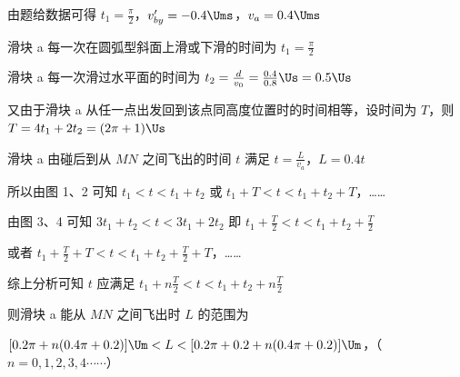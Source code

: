 \documentclass[\gkver]{gaokaozhenti}
\begin{document}
\begin{enumerate}
{

由题给数据可得 $t_{1}=\frac{\pi}{2}$，$v_{by}'=-0.4\Ums$，$v_{a}=0.4\Ums$

滑块 a 每一次在圆弧型斜面上滑或下滑的时间为 $t_{1}=\frac{\pi}{2}$

滑块 a 每一次滑过水平面的时间为 $t_{2}=\frac{d}{v_{0}}=\frac{0.4}{0.8}\Us=0.5\Us$

又由于滑块 a 从任一点出发回到该点同高度位置时的时间相等，设时间为 $T$，则 $T=4t_{1}+2t_{2}=(2\pi+1)\Us$

滑块 a 由碰后到从 $MN$ 之间飞出的时间 $t$ 满足 $t=\frac{L}{v_{a}}$，$L=0.4t$

所以由图 1、2 可知 $t_{1}<t<t_{1}+t_{2}$ 或 $t_{1}+T<t<t_{1}+t_{2}+T$，……

由图 3、4 可知 $3t_{1}+t_{2}<t<3t_{1}+2t_{2}$ 即 $t_{1}+\frac{T}{2}<t<t_{1}+t_{2}+\frac{T}{2}$

或者 $t_{1}+\frac{T}{2}+T<t<t_{1}+t_{2}+\frac{T}{2}+T$，……

综上分析可知 $t$ 应满足 $t_{1}+n\frac{T}{2}<t<t_{1}+t_{2}+n\frac{T}{2}$

则滑块 a 能从 $MN$ 之间飞出时 $L$ 的范围为

$[0.2\pi + n(0.4\pi + 0.2)]\Um < L < [0.2\pi + 0.2 + n(0.4\pi + 0.2)]\Um$，（$n = 0,1,2,3,4\cdots\cdots$）
}


\end{enumerate}
\end{document}
